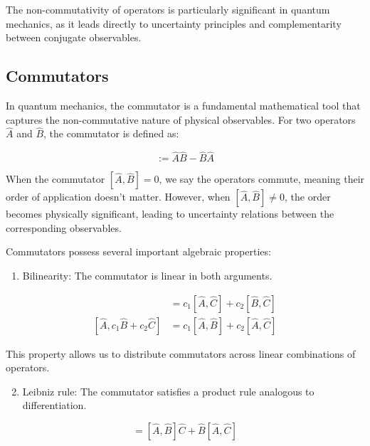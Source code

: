 \documentclass[italian]{HKNdocument}
\begin{document}
The non-commutativity of operators is particularly significant in quantum mechanics, as it leads directly to uncertainty principles and complementarity between conjugate observables.


\subsection{Commutators}

In quantum mechanics, the commutator is a fundamental mathematical tool that captures the non-commutative nature of physical observables. For two operators $\hat{A}$ and $\hat{B}$, the commutator is defined as:

\begin{equation}
[\hat{A}, \hat{B}] := \hat{A}\hat{B} - \hat{B}\hat{A}
\end{equation}

When the commutator $[\hat{A}, \hat{B}] = 0$, we say the operators commute, meaning their order of application doesn't matter. However, when $[\hat{A}, \hat{B}] \neq 0$, the order becomes physically significant, leading to uncertainty relations between the corresponding observables.

Commutators possess several important algebraic properties:

\begin{enumerate}
  \item Bilinearity: The commutator is linear in both arguments.
\end{enumerate}

\begin{align}
[c_{1}\hat{A} + c_{2}\hat{B}, \hat{C}] &= c_{1}[\hat{A}, \hat{C}] + c_{2}[\hat{B}, \hat{C}] \\
[\hat{A}, c_{1}\hat{B} + c_{2}\hat{C}] &= c_{1}[\hat{A}, \hat{B}] + c_{2}[\hat{A}, \hat{C}]
\end{align}

This property allows us to distribute commutators across linear combinations of operators.

\begin{enumerate}
  \setcounter{enumi}{1}
  \item Leibniz rule: The commutator satisfies a product rule analogous to differentiation.
\end{enumerate}

\begin{equation}
[\hat{A}, \hat{B}\hat{C}] = [\hat{A}, \hat{B}]\hat{C} + \hat{B}[\hat{A}, \hat{C}]
\end{equation}
\end{document}
